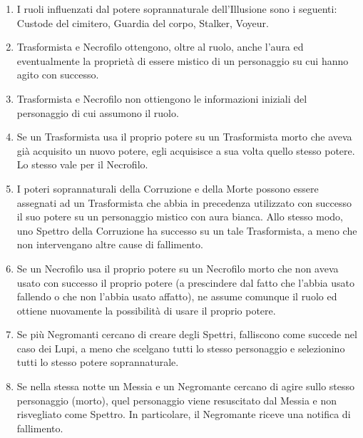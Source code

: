 \documentclass[a4paper,10pt]{article}
\begin{document}
\begin{enumerate}
	\item I ruoli influenzati dal potere soprannaturale dell'Illusione sono i seguenti: Custode del cimitero, Guardia del corpo, Stalker, Voyeur.
	
	\item Trasformista e Necrofilo ottengono, oltre al ruolo, anche l'aura ed eventualmente la proprietà di essere mistico di un personaggio su cui hanno agito con successo.
	
	\item Trasformista e Necrofilo non ottiengono le informazioni iniziali del personaggio di cui assumono il ruolo.
	
	\item Se un Trasformista usa il proprio potere su un Trasformista morto che aveva già acquisito un nuovo potere, egli acquisisce a sua volta quello stesso potere. Lo stesso vale per il Necrofilo.
	
	\item I poteri soprannaturali della Corruzione e della Morte possono essere assegnati ad un Trasformista che abbia in precedenza utilizzato con successo il suo potere su un personaggio mistico con aura bianca. Allo stesso modo, uno Spettro della Corruzione ha successo su un tale Trasformista, a meno che non intervengano altre cause di fallimento.
	
	\item Se un Necrofilo usa il proprio potere su un Necrofilo morto che non aveva usato con successo il proprio potere (a prescindere dal fatto che l'abbia usato fallendo o che non l'abbia usato affatto), ne assume comunque il ruolo ed ottiene nuovamente la possibilità di usare il proprio potere.
 
	\item Se più Negromanti cercano di creare degli Spettri, falliscono come succede nel caso dei Lupi, a meno che scelgano tutti lo stesso personaggio e selezionino tutti lo stesso potere soprannaturale.
	
	\item Se nella stessa notte un Messia e un Negromante cercano di agire sullo stesso personaggio (morto), quel personaggio viene resuscitato dal Messia e non risvegliato come Spettro. In particolare, il Negromante riceve una notifica di fallimento.
	

\end{enumerate}
\end{document}
